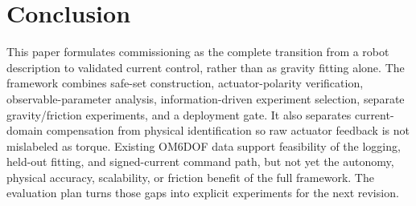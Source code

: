 \documentclass[conference]{IEEEtran}
\begin{document}
\section{Conclusion}
This paper formulates commissioning as the complete transition from a robot
description to validated current control, rather than as gravity fitting alone.
The framework combines safe-set construction, actuator-polarity verification,
observable-parameter analysis, information-driven experiment selection,
separate gravity/friction experiments, and a deployment gate. It also separates
current-domain compensation from physical identification so raw actuator
feedback is not mislabeled as torque. Existing OM6DOF data support feasibility
of the logging, held-out fitting, and signed-current command path, but not yet
the autonomy, physical accuracy, scalability, or friction benefit of the full
framework. The evaluation plan turns those gaps into explicit experiments for
the next revision.



\end{document}
